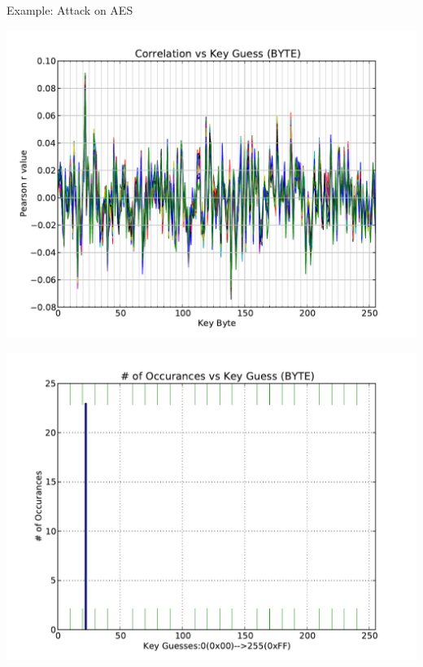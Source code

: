 \documentclass[final]{beamer}
\begin{document}
\begin{frame}[fragile]{}
\begin{columns}[t]
\begin{column}{.31\linewidth}
\begin{block}{Example: Attack on AES}
        \begin{minipage}[t]{0.49\linewidth}
           \includegraphics[width=0.9\linewidth]{../figures/pearsonsCoActual}
        \end{minipage}%
        \begin{minipage}[t]{0.49\linewidth}  
		\includegraphics[width=0.9\linewidth]{../figures/histPearsonsCoActual}
        \end{minipage}
	
       \end{block}
%          
%          
   \end{column}
\end{columns}

\end{frame}
\end{document}
